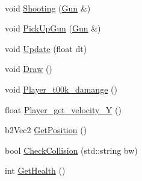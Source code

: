 \begin{DoxyCompactItemize}
$$\item 
void \hyperlink{classSekander_1_1Main__Player_aa2903bcbdbbc88119626429a882b7ab0}{Shooting} (\hyperlink{classSekander_1_1Gun}{Gun} \&)
\item 
void \hyperlink{classSekander_1_1Main__Player_aba0b538754bced9c11d7628d0a5096dd}{Pick\+Up\+Gun} (\hyperlink{classSekander_1_1Gun}{Gun} \&)
\item 
void \hyperlink{classSekander_1_1Main__Player_ae274e228df0f1d40f87e7bf4c83c5c89}{Update} (float dt)
\item 
void \hyperlink{classSekander_1_1Main__Player_a2db8b47f870a130057f550d7edeca43b}{Draw} ()
\item 
void \hyperlink{classSekander_1_1Main__Player_a8d52cc440a3fb8794354930c56cff539}{Player\+\_\+t00k\+\_\+damange} ()
\item 
float \hyperlink{classSekander_1_1Main__Player_af7c8219ebab4cfcfaac1249dd483315c}{Player\+\_\+get\+\_\+velocity\+\_\+Y} ()
\item 
b2\+Vec2 \hyperlink{classSekander_1_1Main__Player_a8177402b385700b10772b069e5b94913}{Get\+Position} ()
\item 
bool \hyperlink{classSekander_1_1Main__Player_aa204098b85f3075555557e167ab87f82}{Check\+Collision} (std\+::string bw)
\item 
int \hyperlink{classSekander_1_1Main__Player_a0da136e5dceaffa007560dbb08784d69}{Get\+Health} ()
\end{DoxyCompactItemize}
